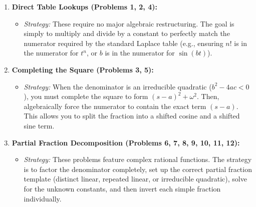 \documentclass[11pt, a4paper]{article}
\theoremstyle{definition}
\theoremstyle{remark}
\begin{document}
\begin{enumerate}
    \item \textbf{Direct Table Lookups (Problems 1, 2, 4):}
    \begin{itemize}
        \item \textit{Strategy:} These require no major algebraic restructuring. The goal is simply to multiply and divide by a constant to perfectly match the numerator required by the standard Laplace table (e.g., ensuring $n!$ is in the numerator for $t^n$, or $b$ is in the numerator for $\sin(bt)$).
    \end{itemize}
    \item \textbf{Completing the Square (Problems 3, 5):}
    \begin{itemize}
        \item \textit{Strategy:} When the denominator is an irreducible quadratic ($b^2 - 4ac < 0$), you must complete the square to form $(s-a)^2 + \omega^2$. Then, algebraically force the numerator to contain the exact term $(s-a)$. This allows you to split the fraction into a shifted cosine and a shifted sine term.
    \end{itemize}
    \item \textbf{Partial Fraction Decomposition (Problems 6, 7, 8, 9, 10, 11, 12):}
    \begin{itemize}
        \item \textit{Strategy:} These problems feature complex rational functions. The strategy is to factor the denominator completely, set up the correct partial fraction template (distinct linear, repeated linear, or irreducible quadratic), solve for the unknown constants, and then invert each simple fraction individually.
    \end{itemize}
\end{enumerate}
\end{document}
